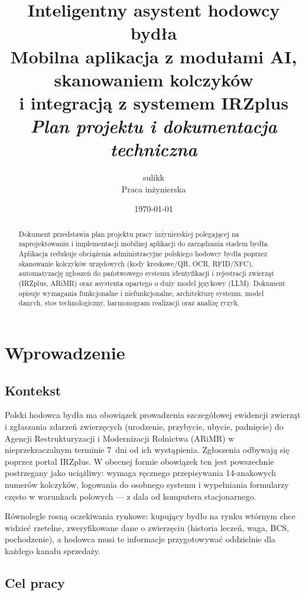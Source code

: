 \documentclass[11pt,a4paper]{article}
\title{
  \vspace{-1.5cm}
  \textbf{Inteligentny asystent hodowcy bydła} \\
  \large Mobilna aplikacja z modułami AI, skanowaniem kolczyków \\ i integracją z systemem IRZplus \\
  \vspace{0.5cm}
  \large \textit{Plan projektu i dokumentacja techniczna}
}
\author{sulikk \\ \small Praca inżynierska}
\date{\today}
\begin{document}
\maketitle

\begin{abstract}
\noindent
Dokument przedstawia plan projektu pracy inżynierskiej polegającej na zaprojektowaniu i implementacji mobilnej aplikacji do zarządzania stadem bydła. Aplikacja redukuje obciążenia administracyjne polskiego hodowcy bydła poprzez skanowanie kolczyków urzędowych (kody kreskowe/QR, OCR, RFID/NFC), automatyzację zgłoszeń do państwowego systemu identyfikacji i rejestracji zwierząt (IRZplus, ARiMR) oraz asystenta opartego o duży model językowy (LLM). Dokument opisuje wymagania funkcjonalne i niefunkcjonalne, architekturę systemu, model danych, stos technologiczny, harmonogram realizacji oraz analizę ryzyk.
\end{abstract}

\tableofcontents
\newpage

\section{Wprowadzenie}

\subsection{Kontekst}

Polski hodowca bydła ma obowiązek prowadzenia szczegółowej ewidencji zwierząt i zgłaszania zdarzeń zwierzęcych (urodzenie, przybycie, ubycie, padnięcie) do Agencji Restrukturyzacji i Modernizacji Rolnictwa (ARiMR) w nieprzekraczalnym terminie 7~dni od ich wystąpienia. Zgłoszenia odbywają się poprzez portal IRZplus. W obecnej formie obowiązek ten jest powszechnie postrzegany jako uciążliwy: wymaga ręcznego przepisywania 14-znakowych numerów kolczyków, logowania do osobnego systemu i wypełniania formularzy często w warunkach polowych --- z dala od komputera stacjonarnego.

Równolegle rosną oczekiwania rynkowe: kupujący bydło na rynku wtórnym chce widzieć rzetelne, zweryfikowane dane o zwierzęciu (historia leczeń, waga, BCS, pochodzenie), a hodowca musi te informacje przygotowywać oddzielnie dla każdego kanału sprzedaży.

\subsection{Cel pracy}
\end{document}
